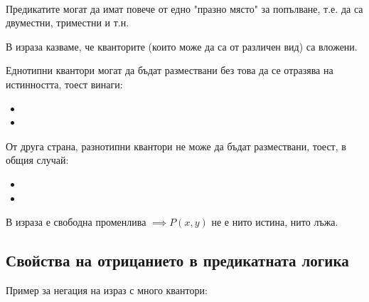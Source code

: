  \\
Предикатите могат да имат повече от едно "празно място" за попълване, т.е. да са двуместни, триместни и т.н.

В израза  казваме, че кванторите (които може да са от различен вид) са
вложени.

Еднотипни квантори могат да бъдат размествани без това да се отразява на истинността, тоест винаги:
\begin{itemize}
    \item {}
    \item {}
\end{itemize}

От друга страна, разнотипни квантори не може да бъдат размествани, тоест, в общия случай:
\begin{itemize}
    \item {}
    \item {}
\end{itemize}

В израза  е свободна променлива \(\implies P(x, y)\) не е нито истина, нито лъжа.

\subsection{Свойства на отрицанието в предикатната логика}
Пример за негация на израз с много квантори: \\
